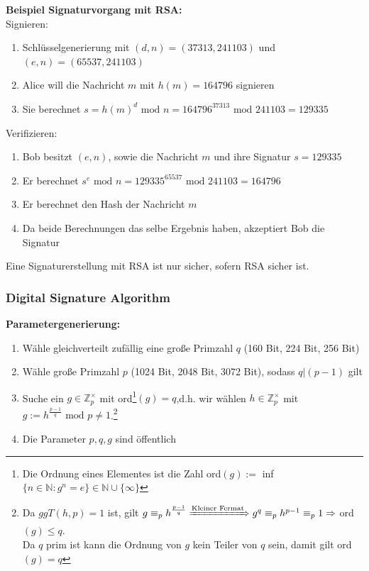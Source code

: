 \documentclass[a4paper,12pt,leqno]{article}
\begin{document}
\textbf{Beispiel Signaturvorgang mit RSA:}\\
Signieren:
\begin{enumerate}
\item Schlüsselgenerierung mit $(d,n)=(37313,241103)$ und $(e,n)=(65537,241103)$
\item Alice will die Nachricht $m$ mit $h(m)=164796$ signieren
\item Sie berechnet $s=h(m)^d\textrm{ mod }n=164796^{37313}\textrm{ mod }241103=129335$ 
\end{enumerate}
Verifizieren:
\begin{enumerate}
\item Bob besitzt $(e,n)$, sowie die Nachricht $m$ und ihre Signatur $s=129335$
\item Er berechnet $s^e\textrm{ mod }n=129335^{65537}\textrm{ mod }241103=164796$
\item Er berechnet den Hash der Nachricht $m$
\item Da beide Berechnungen das selbe Ergebnis haben, akzeptiert Bob die Signatur
\end{enumerate}
Eine Signaturerstellung mit RSA ist nur sicher, sofern RSA sicher ist.

\subsubsection{Digital Signature Algorithm}

\textbf{Parametergenerierung:}
\begin{enumerate}
\item Wähle gleichverteilt zufällig eine große Primzahl $q$ (160 Bit, 224 Bit, 256 Bit)
\item Wähle große Primzahl $p$ (1024 Bit, 2048 Bit, 3072 Bit), sodass $q|(p-1)$ gilt
\item Suche ein $g\in\mathbb{Z}_p^\times$ mit ord\footnote{Die Ordnung eines Elementes ist die Zahl ord$(g):=$ inf$\{n\in\mathbb{N}:g^n=e\}\in\mathbb{N}\cup\{\infty\}$}$(g)=q$,d.h. wir wählen $h\in\mathbb{Z}_p^\times$ mit $g:=h^{\frac{p-1}{q}}\textrm{ mod } p \neq 1$.\footnote{ Da $ggT(h,p)=1$ ist, gilt $g\equiv_p h^{\frac{p-1}{q}}\xRightarrow{\text{Kleiner Fermat}}g^q\equiv_p h^{p-1}\equiv_p 1\Rightarrow$ ord$(g)\leq q$.\\ Da $q$ prim ist kann die Ordnung von $g$ kein Teiler von $q$ sein, damit gilt ord$(g)=q$}
\item Die Parameter $p,q,g$ sind öffentlich
\end{enumerate}
\end{document}
